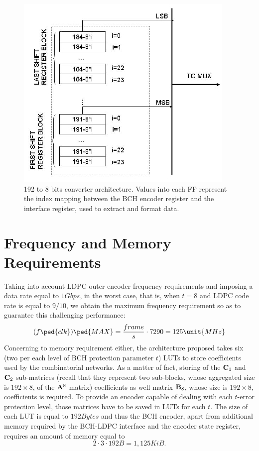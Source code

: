 \begin{figure} \centering
\includegraphics[scale=1]{download}
\caption{192 to 8 bits converter architecture. Values into each FF represent the index mapping between the BCH encoder register and the interface register, used to extract and format data.} \label{fig:Download}
\end{figure}


\section{Frequency and Memory Requirements}

Taking into account LDPC outer encoder frequency requirements and imposing a data rate equal to \(1 \unit{Gbps}\), in the worst case, that is, when \(t=8\) and LDPC code rate is equal to \(9/10\), we obtain the maximum frequency requirement so as to guarantee this challenging performance:
\begin{equation}
(f\ped{clk})\ped{MAX}= \frac{frame}{s}\cdot 7290 = 125 \unit{MHz}
\end{equation}
Concerning to memory requirement either, the architecture proposed takes six (two per each level of BCH protection parameter \(t\)) LUTs to store coefficients used by the combinatorial networks. As a matter of fact, storing of the \(\mathbf{C}_1\) and \(\mathbf{C}_2\) sub-matrices (recall that they represent two sub-blocks, whose aggregated size is \(192 \times 8\), of the \(\mathbf{A}^8\) matrix) coefficients as well matrix \(\mathbf{B}_8\), whose size is \(192 \times 8\), coefficients is required. To provide an encoder capable of dealing with each \(t\)-error protection level, those matrices have to be saved in LUTs for each \(t\).
The size of each LUT is equal to \(192 \unit{Bytes}\) and thus the BCH encoder, apart from additional memory required by the BCH-LDPC interface and the encoder state register, requires an amount of memory equal to
\begin{equation}
 2\cdot3\cdot192\unit{B} = 1,125\unit{KiB}.
\end{equation}

